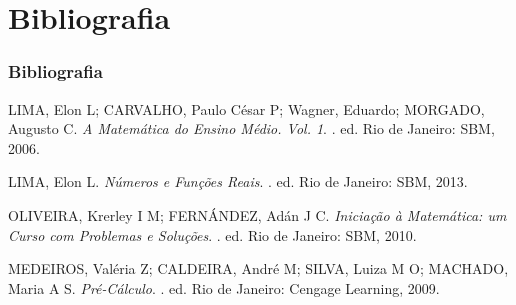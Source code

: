 \section{Bibliografia}


\begin{frame}
    \frametitle{Bibliografia}

    \begin{thebibliography}{99}
        LIMA, Elon L; CARVALHO, Paulo César P; Wagner, Eduardo; MORGADO,
        Augusto C.
        \newblock \emph{A Matemática do Ensino Médio. Vol. 1}.
        . ed. Rio de Janeiro: SBM, 2006.


        LIMA, Elon L.
        \newblock \emph{Números e Funções Reais}.
        . ed. Rio de Janeiro: SBM, 2013.
        

        OLIVEIRA, Krerley I M; FERNÁNDEZ, Adán J C.
        \newblock \emph{Iniciação à Matemática: um Curso com Problemas e Soluções}.
        . ed. Rio de Janeiro: SBM, 2010.

		MEDEIROS, Valéria Z; CALDEIRA, André M; SILVA, Luiza M O; MACHADO,
		Maria A S.
		\newblock \emph{Pré-Cálculo}.
		. ed. Rio de Janeiro: Cengage Learning, 2009.
    \end{thebibliography}
\end{frame}
